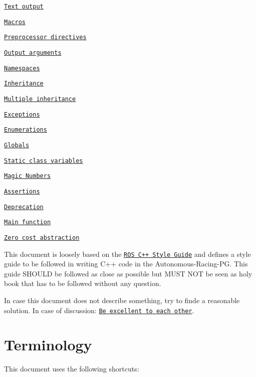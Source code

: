 \begin{DoxyItemize}
\item \href{#text-output}{\tt Text output}
\item \href{#macros}{\tt Macros}
\item \href{#preprocessor-directives}{\tt Preprocessor directives}
\item \href{#output-arguments}{\tt Output arguments}
\item \href{#namespaces-1}{\tt Namespaces}
\item \href{#inheritance}{\tt Inheritance}
\begin{DoxyItemize}
\item \href{#multiple-inheritance}{\tt Multiple inheritance}
\end{DoxyItemize}
\item \href{#exceptions}{\tt Exceptions}
\item \href{#enumerations}{\tt Enumerations}
\item \href{#globals}{\tt Globals}
\item \href{#static-class-variables}{\tt Static class variables}
\item \href{#magic-numbers}{\tt Magic Numbers}
\item \href{#assertions}{\tt Assertions}
\item \href{#deprecation}{\tt Deprecation}
\item \href{#main-function}{\tt Main function}
\item \href{#zero-cost-abstraction}{\tt Zero cost abstraction}
\end{DoxyItemize}

This document is loosely based on the \href{http://wiki.ros.org/CppStyleGuide}{\tt R\+OS C++ Style Guide} and defines a style guide to be followed in writing C++ code in the Autonomous-\/\+Racing-\/\+PG. This guide S\+H\+O\+U\+LD be followed as close as possible but M\+U\+ST N\+OT be seen as holy book that has to be followed without any question.

In case this document does not describe something, try to finde a reasonable solution. In case of discussion\+: \href{https://www.youtube.com/watch?v=rph_1DODXDU}{\tt Be excellent to each other}.

\section*{Terminology}

This document uses the following shortcuts\+:


